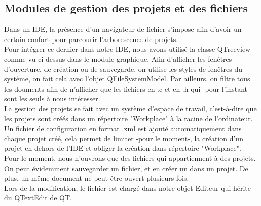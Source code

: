\documentclass[a4paper,12pt]{article}
\begin{document}
		\newpage			
		\subsection{Modules de gestion des projets et des fichiers}
		
		Dans un IDE, la présence d’un navigateur de fichier s’impose afin d’avoir un certain confort pour parcourir l’arborescence de projets.\\
		Pour intégrer ce dernier dans notre IDE, nous avons utilisé la classe QTreeview comme vu ci-dessus dans le module graphique. Afin d'afficher les fenêtres d'ouverture, de création ou de sauvegarde, on utilise les styles de fenêtres du système, on fait cela avec l'objet QFileSystemModel. Par ailleurs, on filtre tous les douments afin de n'afficher que les fichiers en .c et en .h qui -pour l'instant- sont les seuls à nous intéresser.\\
		
		La gestion des projets se fait avec un système d'espace de travail, c’est-à-dire que les projets sont créés dans un répertoire "Workplace" à la racine de l’ordinateur. Un fichier de configuration en format .xml est ajouté automatiquement dans chaque projet créé, cela permet de limiter -pour le moment-, la création d’un projet en dehors de l’IDE et obliger la création dans répertoire "Workplace".\\
		
		Pour le moment, nous n'ouvrons que des fichiers qui appartiennent à des projets. On peut évidemment sauvegarder un fichier, et en créer un dans un projet. De plus, un même document ne peut être ouvert plusieurs fois.\\
		Lors de la modification, le fichier est chargé dans notre objet Editeur qui hérite du QTextEdit de QT.
		
\end{document}
